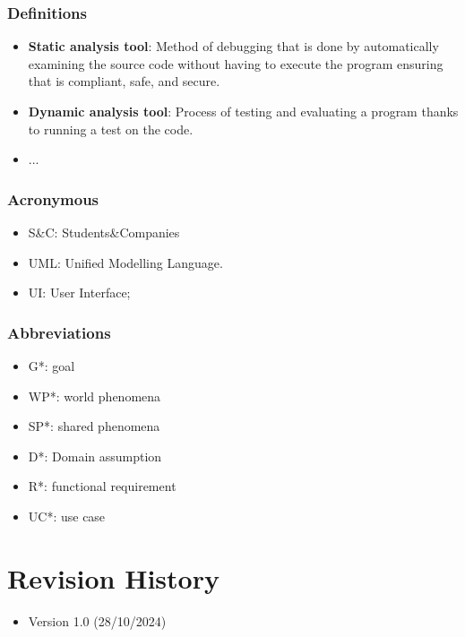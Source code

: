 \subsubsection{Definitions}
\begin{itemize}
    \item \textbf{Static analysis tool}: Method of debugging that is done by automatically examining the source code without having to execute the program ensuring that is compliant, safe, and secure.
    \item \textbf{Dynamic analysis tool}: Process of testing and evaluating a program thanks to running a test on the code.

    \item ...
\end{itemize}

\subsubsection{Acronymous}
\begin{itemize}
    \item S\&C: Students\&Companies
    \item UML: Unified Modelling Language.
    \item UI: User Interface;
\end{itemize}

\subsubsection{Abbreviations}
\begin{itemize}
    \item G*: goal
    \item WP*: world phenomena
    \item SP*: shared phenomena
    \item D*: Domain assumption
    \item R*: functional requirement
    \item UC*: use case
\end{itemize}
  
\section{Revision History}

\begin{itemize}
    \item Version 1.0 (28/10/2024)
\end{itemize}

